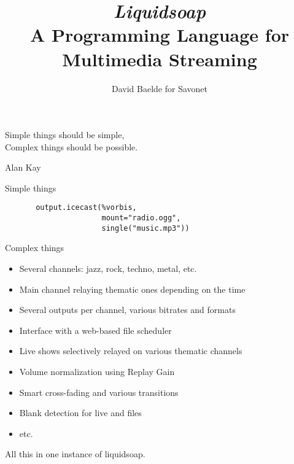 \documentclass{beamer}
\title{\emph{\LARGE Liquidsoap} \\
  A Programming Language for \\ Multimedia Streaming}
\date{David Baelde for Savonet} %
\renewcommand{\emph}[1]{\alert{#1}}
\begin{document}
\begin{frame}
  \maketitle
\end{frame}

\begin{frame}

\vfill

\begin{center}
{\LARGE
Simple things should be simple, \\[1ex]
Complex things should be possible.
}
\begin{flushright}
Alan Kay \hspace{0.5cm} ~
\end{flushright}
\end{center}

\vfill

\end{frame}


\begin{frame}[fragile]{Simple things}

\begin{lstlisting}
       output.icecast(%vorbis,
                      mount="radio.ogg",
                      single("music.mp3"))
\end{lstlisting}

\end{frame}


\begin{frame}{Complex things}

\begin{example}[Radio Pi]
\begin{itemize}
\item \emph{Several channels}: jazz, rock, techno, metal, etc.
\item Main channel relaying thematic ones depending on the time
\item \emph{Several outputs per channel}, various bitrates and formats
\item Interface with a web-based \emph{file scheduler}
\item \emph{Live shows} selectively relayed on various thematic channels
\item Volume normalization using \emph{Replay Gain}
\item Smart \emph{cross-fading} and various transitions
\item \emph{Blank detection} for live and files
\item etc.
\end{itemize}
All this in \emph{one instance} of liquidsoap.
\end{example}

\end{frame}
\end{document}

